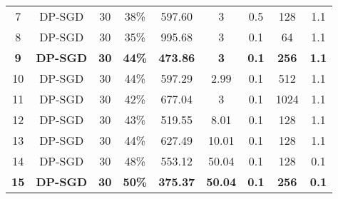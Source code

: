 \begin{table}[!ht]
{\begin{tabular}{|c|c|c|c|c|c|c|c|c|}
            7                      & DP-SGD             & 30              & 38\%              & 597.60                     & 3                     & 0.5                    & 128                 & 1.1                       \\
            8                      & DP-SGD             & 30              & 35\%              & 995.68                     & 3                     & 0.1                    & 64                  & 1.1                       \\
            \textbf{9}             & \textbf{DP-SGD}    & \textbf{30}     & \textbf{44\%}     & \textbf{473.86}            & \textbf{3}            & \textbf{0.1}           & \textbf{256}        & \textbf{1.1}              \\
            10                     & DP-SGD             & 30              & 44\%              & 597.29                     & 2.99                  & 0.1                    & 512                 & 1.1                       \\
            11                     & DP-SGD             & 30              & 42\%              & 677.04                     & 3                     & 0.1                    & 1024                & 1.1                       \\
            12                     & DP-SGD             & 30              & 43\%              & 519.55                     & 8.01                  & 0.1                    & 128                 & 1.1                       \\
            13                     & DP-SGD             & 30              & 44\%              & 627.49                     & 10.01                 & 0.1                    & 128                 & 1.1                       \\
            14                     & DP-SGD             & 30              & 48\%              & 553.12                     & 50.04                 & 0.1                    & 128                 & 0.1                       \\
            \textbf{15}            & \textbf{DP-SGD}    & \textbf{30}     & \textbf{50\%}     & \textbf{375.37}            & \textbf{50.04}        & \textbf{0.1}           & \textbf{256}        & \textbf{0.1}              \\

            \hline
        \end{tabular}
    } %
    \label{tab:exp_results}  %
\end{table}

